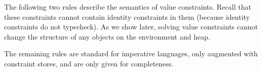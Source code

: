 

The following two rules describe the semantics of value constraints.
Recall that these constraints cannot contain identity constraints in them
(because identity constraints do not typecheck).  As we show later,
solving value constraints cannot change the structure of any objects
on the environment and heap.



The remaining rules are standard for imperative languages, only
augmented with constraint stores, and are only given for completeness.






